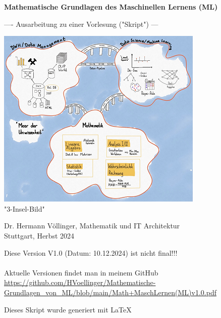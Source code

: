 \documentclass[12pt]{article}
\begin{document}

\begin{titlepage}
   \begin{center}
   \LARGE  
   \vspace{1.0cm}
       
   \textbf{Mathematische Grundlagen des Maschinellen Lernens (ML)}

   \vspace{1.0cm}
  
   \large       
   ---- Ausarbeitung zu einer Vorlesung ("Skript") ---
       
   
   \vspace{1.0cm}
   
   \includegraphics{DWH-Zeichnung}\\
   \small "3-Insel-Bild"  
       
   \vfill
   \large   
   
   Dr. Hermann Völlinger, Mathematik und IT Architektur
           \\ Stuttgart, Herbst 2024     

   \vspace{0.6cm}
        
   \end{center}
   
\begin{center}
Diese Version V1.0 (Datum: 10.12.2024) ist nicht final!!! \\
{\color{blue}{(Beachte: ************ Kommentare *********)}} \\[0.3cm]
Aktuelle Versionen findet man in meinem GitHub\\[0.1cm]
\url{https://github.com/HVoellinger/Mathematische-Grundlagen_von_ML/blob/main/Math+MaschLernen(ML)v1.0.pdf} \\
\vspace{0.4cm}
\begin{large}
Dieses Skript wurde generiert mit \LaTeX\  
\end{large}
\end{center}


\end{titlepage}
\end{document}
